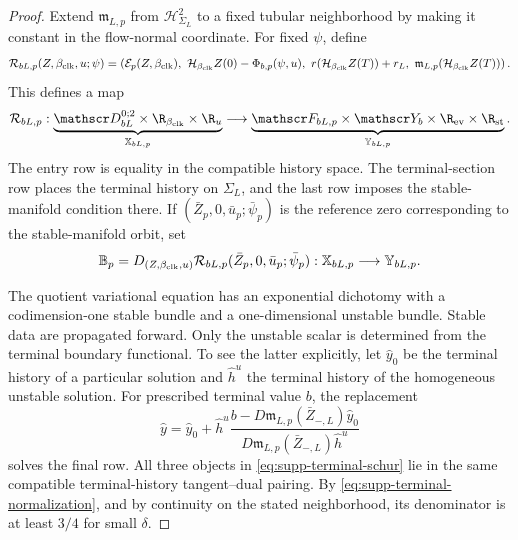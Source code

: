 \begin{proof}
Extend \(\mathfrak m_{L,p}\) from \(\mathscr H_{\Sigma_L}^2\) to a fixed
tubular neighborhood by making it constant in the flow-normal coordinate.
For fixed \(\psi\), define
\begin{equation}
 \mathcal R_{bL,p}(Z,\beta_{\rm clk},u;\psi)
 =\left(
 \mathcal E_p(Z,\beta_{\rm clk}),\
 \mathcal H_{\beta_{\rm clk}} Z(0)-\Phi_{b,p}(\psi,u),\
 r(\mathcal H_{\beta_{\rm clk}} Z(T))+r_L,\
 \mathfrak m_{L,p}(\mathcal H_{\beta_{\rm clk}} Z(T))
 \right).
 \label{eq:supp-mixed-residual}
\end{equation}
This defines a map
\begin{equation}
 \mathcal R_{bL,p}:
 \underbrace{\mathscr D_{bL}^{0;2}\times\R_{\beta_{\rm clk}}\times\R_u}
             _{\mathbb X_{bL,p}}
 \longrightarrow
 \underbrace{\mathscr F_{bL,p}\times\mathscr Y_b
             \times\R_{\rm ev}\times\R_{\rm st}}
             _{\mathbb Y_{bL,p}}.
 \label{eq:supp-mixed-residual-spaces}
\end{equation}
The entry row is equality in the compatible history space.  The
terminal-section row
places the terminal history on \(\Sigma_L\), and the last row imposes the
stable-manifold condition there.  If
\((\bar Z_p,0,\bar u_p;\bar\psi_p)\) is the reference zero corresponding to
the stable-manifold orbit, set
\begin{equation}
 \mathbb B_p
 =D_{(Z,\beta_{\rm clk},u)}\mathcal R_{bL,p}
       (\bar Z_p,0,\bar u_p;\bar\psi_p)
 :\mathbb X_{bL,p}\longrightarrow\mathbb Y_{bL,p}.
 \label{eq:supp-mixed-linearization}
\end{equation}

The quotient variational equation has an exponential dichotomy with a
codimension-one stable bundle and a one-dimensional unstable bundle.
Stable data are propagated forward.  Only the unstable scalar is
determined from the terminal boundary functional.  To see the latter
explicitly, let
\(\widehat y_0\) be the terminal history of a particular solution and
\(\widehat h^u\) the terminal history of the homogeneous unstable solution.
For prescribed terminal value \(b\), the replacement
\begin{equation}
 \widehat y=\widehat y_0+\widehat h^u
 \frac{b-D\mathfrak m_{L,p}(\bar Z_{-,L})\widehat y_0}
      {D\mathfrak m_{L,p}(\bar Z_{-,L})\widehat h^u}
 \label{eq:supp-terminal-schur}
\end{equation}
solves the final row.  All three objects in
\cref{eq:supp-terminal-schur} lie in the same compatible terminal-history
tangent--dual pairing.  By \cref{eq:supp-terminal-normalization}, and by
continuity on the stated neighborhood, its denominator is at least
\(3/4\) for small \(\delta\).


\end{proof}
